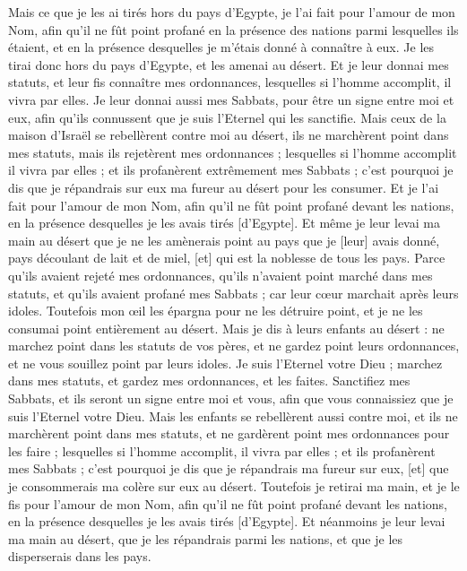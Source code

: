 \begin{multicols}{2}
Mais ce que je les ai tirés hors du pays d'Egypte, je l'ai fait pour l'amour de mon Nom, afin qu'il ne fût point profané en la présence des nations parmi lesquelles ils étaient, et en la présence desquelles je m'étais donné à connaître à eux.
Je les tirai donc hors du pays d'Egypte, et les amenai au désert.
Et je leur donnai mes statuts, et leur fis connaître mes ordonnances, lesquelles si l'homme accomplit, il vivra par elles.
Je leur donnai aussi mes Sabbats, pour être un signe entre moi et eux, afin qu'ils connussent que je suis l'Eternel qui les sanctifie.
Mais ceux de la maison d'Israël se rebellèrent contre moi au désert, ils ne marchèrent point dans mes statuts, mais ils rejetèrent mes ordonnances ; lesquelles si l'homme accomplit il vivra par elles ; et ils profanèrent extrêmement mes Sabbats ; c'est pourquoi je dis que je répandrais sur eux ma fureur au désert pour les consumer.
Et je l'ai fait pour l'amour de mon Nom, afin qu'il ne fût point profané devant les nations, en la présence desquelles je les avais tirés [d'Egypte].
Et même je leur levai ma main au désert que je ne les amènerais point au pays que je [leur] avais donné, pays découlant de lait et de miel, [et] qui est la noblesse de tous les pays.
Parce qu'ils avaient rejeté mes ordonnances, qu'ils n'avaient point marché dans mes statuts, et qu'ils avaient profané mes Sabbats ; car leur cœur marchait après leurs idoles.
Toutefois mon œil les épargna pour ne les détruire point, et je ne les consumai point entièrement au désert.
Mais je dis à leurs enfants au désert : ne marchez point dans les statuts de vos pères, et ne gardez point leurs ordonnances, et ne vous souillez point par leurs idoles.
Je suis l'Eternel votre Dieu ; marchez dans mes statuts, et gardez mes ordonnances, et les faites.
Sanctifiez mes Sabbats, et ils seront un signe entre moi et vous, afin que vous connaissiez que je suis l'Eternel votre Dieu.
Mais les enfants se rebellèrent aussi contre moi, et ils ne marchèrent point dans mes statuts, et ne gardèrent point mes ordonnances pour les faire ; lesquelles si l'homme accomplit, il vivra par elles ; et ils profanèrent mes Sabbats ; c'est pourquoi je dis que je répandrais ma fureur sur eux, [et] que je consommerais ma colère sur eux au désert.
Toutefois je retirai ma main, et je le fis pour l'amour de mon Nom, afin qu'il ne fût point profané devant les nations, en la présence desquelles je les avais tirés [d'Egypte].
Et néanmoins je leur levai ma main au désert, que je les répandrais parmi les nations, et que je les disperserais dans les pays.

\end{multicols}
